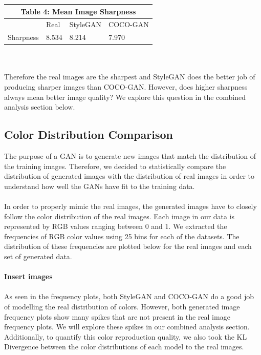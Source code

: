 \documentclass[10pt]{article}
\begin{document}
\begin{multicols*}{2}
        \begin{tabular}{ |p{2cm}|p{2cm}|p{2cm}|p{2cm}|  }
             \hline
             \multicolumn{4}{|c|}{Table 4: Mean Image Sharpness} \\
             \hline
            & Real & StyleGAN & COCO-GAN  \\
            \hline
            Sharpness & 8.534    & 8.214      & 7.970\\
            \hline
        \end{tabular}
        \\\\
        Therefore the real images are the sharpest and StyleGAN does the better job of producing sharper images than COCO-GAN.
        However, does higher sharpness always mean better image quality?
        We explore this question in the combined analysis section below.

        \subsection{Color Distribution Comparison}
        \label{subsec:colorDistribution}

        The purpose of a GAN is to generate new images that match the distribution of the training images. Therefore, we decided to statistically compare the distribution of generated images with the distribution of real images in order to understand how well the GANs have fit to the training data.
        \\\\
        In order to properly mimic the real images, the generated images have to closely follow the color distribution of the real images. Each image in our data is represented by RGB values ranging between 0 and 1. We extracted the frequencies of RGB color values using 25 bins for each of the datasets. The distribution of these frequencies are plotted below for the real images and each set of generated data.
        \\\\
        \textbf{Insert images}
        \\\\
        As seen in the frequency plots, both StyleGAN and COCO-GAN do a good job of modelling the real distribution of colors.
        However, both generated image frequency plots show many spikes that are not present in the real image frequency plots.
        We will explore these spikes in our combined analysis section. Additionally, to quantify this color reproduction quality, we also took the KL Divergence between the color distributions of each model to the real images.\\


\end{multicols*}
\end{document}
